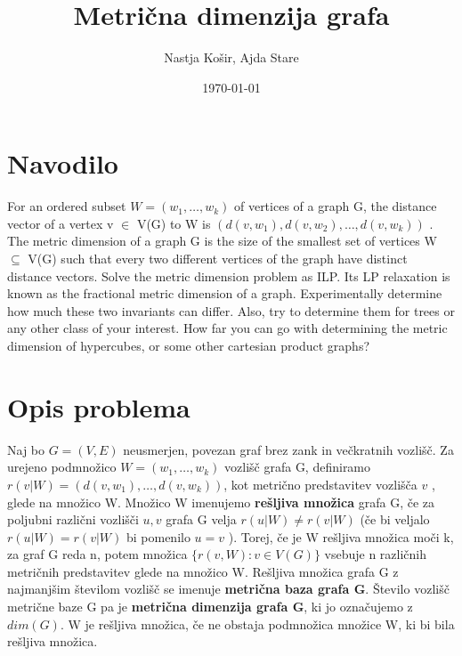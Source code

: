 \documentclass[a4paper]{report}
\title{Metrična dimenzija grafa }
\author{Nastja Košir, Ajda Stare}
\date{\today}
\begin{document}
	\maketitle

\section{Navodilo}
For an ordered subset $W = (w_1 , \dots, w_k ) $ of vertices of a graph G, the distance vector of a vertex v $\in$ V(G)  to  W  is  $(d(v, w_1 ), d(v, w_2 ), \dots, d(v, w_k ))$ . The metric dimension of a graph G is the size of the smallest set of vertices W  $\subseteq $ V(G) such that every two different vertices of the graph have distinct distance vectors. Solve the metric dimension problem as ILP. Its LP relaxation is known as the fractional metric dimension of a graph. Experimentally determine how much these two invariants can differ. Also, try to determine them for trees or any other class of your interest. How far you can go with determining the metric dimension of hypercubes, or some other cartesian product graphs?\\

\section{Opis problema}
Naj bo $G=(V,E)$ neusmerjen, povezan graf brez zank in večkratnih vozlišč. Za urejeno podmnožico $ W =(w_1 , \dots, w_k )$ vozlišč grafa G, definiramo\\$r(v|W) = (d(v,w_1),\dots, d(v,w_k))$, kot  metrično predstavitev vozlišča $v$ , glede na množico W. Množico W imenujemo \textbf{rešljiva množica} grafa G, če za poljubni  različni vozlišči $u,v$ grafa G velja $r(u|W)\neq r(v|W)$ (če bi veljalo $r(u|W)= r(v|W)$ bi pomenilo $u = v$ ). Torej, če je W rešljiva množica moči k, za graf G reda n, potem množica $\{r(v,W): v\in V(G)\}$ vsebuje n različnih metričnih predstavitev glede na množico W. Rešljiva množica grafa G z najmanjšim številom vozlišč se imenuje \textbf{metrična baza grafa G}. Število vozlišč metrične baze G pa je \textbf{metrična dimenzija grafa G}, ki jo označujemo z \textbf{$dim(G)$}. W je rešljiva množica, če ne obstaja podmnožica množice W, ki bi bila rešljiva množica.  

\end{document}

